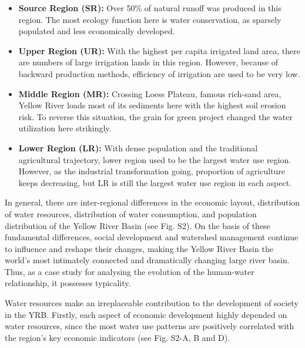 \documentclass[9pt,twoside,lineno]{pnas-new}
\begin{document}
\begin{itemize}
    \item \textbf{Source Region (SR):} Over 50\% of natural runoff was produced in this region. The most ecology function here is water conservation, as sparsely populated and less economically developed.
    \item \textbf{Upper Region (UR):} With the highest per capita irrigated land area, there are numbers of large irrigation lands in this region. However, because of backward production methods, efficiency of irrigation are used to be very low.
    \item \textbf{Middle Region (MR):} Crossing Loess Plateau, famous rich-sand area, Yellow River loads most of its sediments here with the highest soil erosion risk. To reverse this situation, the grain for green project changed the water utilization here strikingly.
    \item \textbf{Lower Region (LR):} With dense population and the traditional agricultural trajectory, lower region used to be the largest water use region. However, as the industrial transformation going, proportion of agriculture keeps decreasing, but LR is still the largest water use region in each aspect.
\end{itemize}

In general, there are inter-regional differences in the economic layout, distribution of water resources, distribution of water consumption, and population distribution of the Yellow River Basin (see Fig. S2). On the basis of these fundamental differences, social development and watershed management continue to influence and reshape their changes, making the Yellow River Basin the world's most intimately connected and dramatically changing large river basin. Thus, as a case study for analysing the evolution of the human-water relationship, it possesses typicality.

Water resources make an irreplaceable contribution to the development of society in the YRB. Firstly, each aspect of economic development highly depended on water resources, since the most water use patterns are positively correlated with the region's key economic indicators (see Fig. S2-A, B and D). 
\end{document}
